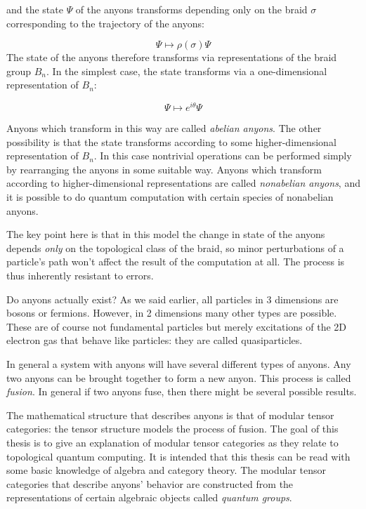 and the state $\Psi$ of the anyons transforms depending only on the braid $\sigma$ corresponding to the trajectory of the anyons:

\begin{equation}
    \Psi \mapsto \rho(\sigma)\Psi
\end{equation}
The state of the anyons therefore transforms via representations of the braid
group $B_n$. In the simplest case, the state transforms via a one-dimensional
representation of $B_n$:

\begin{equation}
    \Psi \mapsto e^{i\theta}\Psi
\end{equation}

Anyons which transform in this way are called \emph{abelian anyons}. The other
possibility is that the state transforms according to some higher-dimensional
representation of $B_n$. In this case nontrivial operations can be performed
simply by rearranging the anyons in some suitable way. Anyons which transform
according to higher-dimensional representations are called \emph{nonabelian
anyons}, and it is possible to do quantum computation with certain species
of nonabelian anyons.

The key point here is that in this model the change in state of the anyons
depends \emph{only} on the topological class of the braid, so minor
perturbations of a particle's path won't affect the result of the computation
at all. The process is thus inherently resistant to errors. 

Do anyons actually exist? As we said earlier, all particles in 3 dimensions are
bosons or fermions. However, in 2 dimensions many other types are possible.
These are of course not fundamental particles but merely excitations of the 2D
electron gas that behave like particles: they are called quasiparticles.

In general a system with anyons will have several different types of anyons.
Any two anyons can be brought together to form a new anyon. This process is
called \emph{fusion}. In general if two anyons fuse, then there might be
several possible results. 

The mathematical structure that describes anyons is that of modular tensor
categories: the tensor structure models the process of fusion. The goal of this
thesis is to give an explanation of modular tensor categories as they relate to
topological quantum computing. It is intended that this thesis can be read with
some basic knowledge of algebra and category theory. The modular tensor
categories that describe anyons' behavior are constructed from the
representations of certain algebraic objects called \emph{quantum groups}.



